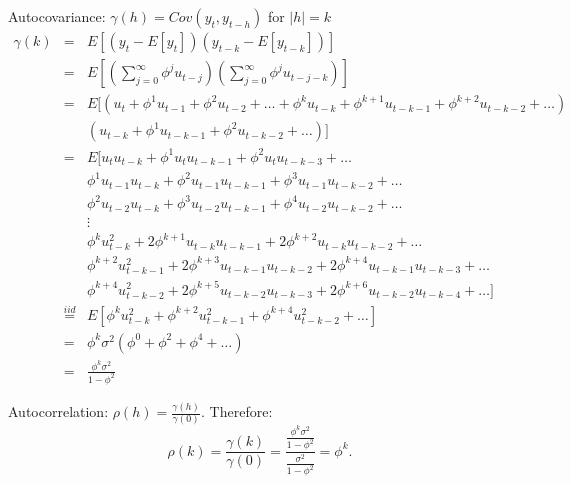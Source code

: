 \begin{enumerate}
\begin{solution}
              Autocovariance: $\gamma(h)  = Cov(y_{t}, y_{t-h})$ for $|h| = k$
              \begin{eqnarray*}
                  \gamma(k)
                  &=& E[(y_{t}-E[y_{t}])(y_{t-k}-E[y_{t-k}])] \\
                  &=& E[(\sum_{j=0}^{\infty} \phi^j
                          u_{t-j})(\sum_{j=0}^{\infty} \phi^j u_{t-j-k})] \\
                  &=& E[(u_{t} + \phi^1 u_{t-1} + \phi^2 u_{t-2} + \dots +
                          \phi^k u_{t-k}  + \phi^{k+1} u_{t-k-1} + \phi^{k+2} u_{t-k-2} + \dots) \\
                          && 	(u_{t-k}  + \phi^{1} u_{t-k-1} + \phi^{2} u_{t-k-2} + \dots)] \\
                  &=& E[u_{t}u_{t-k} + \phi^1 u_{t} u_{t-k-1} + \phi^2 u_{t}
                  u_{t-k-3} + \dots   \\
                  &&	\phi^1 u_{t-1}u_{t-k} + \phi^2 u_{t-1}u_{t-k-1}	+ \phi^3
                  u_{t-1}u_{t-k-2} + \dots \\
                  && 	\phi^2 u_{t-2}u_{t-k} + \phi^3 u_{t-2}u_{t-k-1}	+
                  \phi^4 u_{t-2}u_{t-k-2} + \dots \\
                  &&	\vdots \\
                  &&  \phi^{k} u_{t-k}^2 + 2\phi^{k+1} u_{t-k}u_{t-k-1}	+
                  2\phi^{k+2} u_{t-k}u_{t-k-2} + \dots \\
                  && 	\phi^{k+2} u_{t-k-1}^2 + 2\phi^{k+3} u_{t-k-1}u_{t-k-2} +
                  2\phi^{k+4} u_{t-k-1}u_{t-k-3} + \dots \\
                  && 	\phi^{k+4} u_{t-k-2}^2 + 2\phi^{k+5} u_{t-k-2}u_{t-k-3} +
                  2\phi^{k+6} u_{t-k-2}u_{t-k-4} + \dots] \\
                  &\overset{iid}{=}&
                  E[\phi^{k}u_{t-k}^2 + \phi^{k+2}u_{t-k-1}^2 + \phi^{k+4}u_{t-k-2}^2 + \dots] \\
                  &=& \phi^{k}\sigma^2(\phi^0 + \phi^2 + \phi^4 + \dots ) \\
                  &=& \frac{\phi^{k}\sigma^2}{1-\phi^2}
              \end{eqnarray*}

              Autocorrelation: $\rho(h)  = \frac{\gamma(h)}{\gamma(0)}$. Therefore:
              \begin{displaymath}
                  \rho(k) = \frac{\gamma(k)}{\gamma(0)} = \frac{\frac{\phi^{k}\sigma^2}{1-\phi^2}}{\frac{\sigma^2}{1-\phi^2}} = \phi^{k}.
              \end{displaymath}
          \end{solution}


\end{enumerate}
